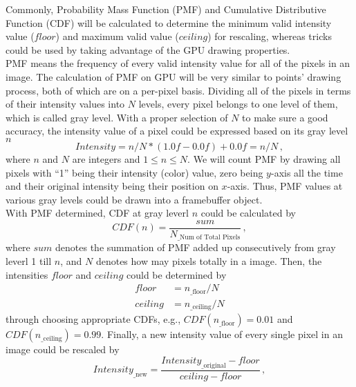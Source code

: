 %
Commonly, Probability Mass Function (PMF) and Cumulative Distributive Function (CDF) will be calculated to determine the minimum valid intensity value (\(floor\)) and maximum valid value (\(ceiling\)) for rescaling, whereas tricks could be used by taking advantage of the GPU drawing properties.%
\\\indent%
PMF means the frequency of every valid intensity value for all of the pixels in an image. The calculation of PMF on GPU will be very similar to points' drawing process, both of which are on a per-pixel basis. Dividing all of the pixels in terms of their intensity values into \(N\) levels, every pixel belongs to one level of them, which is called gray level. With a proper selection of \(N\) to make sure a good accuracy, the intensity value of a pixel could be expressed based on its gray level \(n\)
%
\begin{equation}
Intensity = n/N * (1.0f - 0.0f) + 0.0f = n/N \, ,
\end{equation}%
\noindent
where \(n\) and \(N\) are integers and \(1 \leqslant n \leqslant N\). We will count PMF by drawing all pixels with \enquote{1} being their intensity (color) value, zero being \(y\)-axis all the time and their original intensity being their position on \(x\)-axis. Thus, PMF values at various gray levels could be drawn into a framebuffer object.
\\\indent%
With PMF determined, CDF at gray leverl \(n\) could be calculated by
%
\begin{equation}
CDF(n) = \frac{sum}{N_{\text{\_Num of Total Pixels}}} \, ,
\end{equation}%
%
where \(sum\) denotes the summation of PMF added up consecutively from gray leverl 1 till \(n\), and \(N\) denotes how may pixels totally in a image. %
%
Then, the intensities \(floor\) and \(ceiling\) could be determined by 
%
\begin{equation}
\begin{aligned}
floor &=  n_{\text{\_floor}} / N%
\\%
ceiling &=  n_{\text{\_ceiling}} / N 
\end{aligned}
\label{intensityFloorCeilingDetermination}
\end{equation}%
through choosing appropriate CDFs, e.g., \(CDF(n_{\text{\_floor}}) = 0.01\) and \(CDF(n_{\text{\_ceiling}}) = 0.99\). Finally, a new intensity value of every single pixel in an image could be rescaled by
%
\begin{equation}
Intensity_{\text{\_new}} = \frac{Intensity_{\text{\_original}} - floor}{ceiling - floor} \, ,
\end{equation}%
